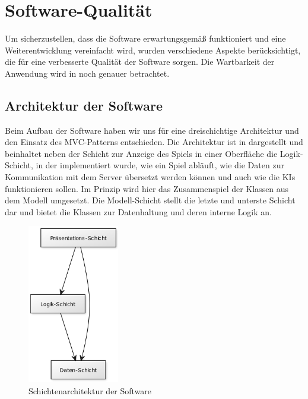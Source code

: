 \chapter{Software-Qualität}
\label{ch:software-qualitaet}

Um sicherzustellen, dass die Software erwartungsgemäß funktioniert und eine Weiterentwicklung vereinfacht wird, wurden
verschiedene Aspekte berücksichtigt, die für eine verbesserte Qualität der Software sorgen.
Die Wartbarkeit der Anwendung wird in  noch genauer betrachtet.

\section{Architektur der Software}
\label{sec:software-architektur}

Beim Aufbau der Software haben wir uns für eine dreischichtige Architektur und den Einsatz des \ac{MVC}-Patterns
 entschieden.
Die Architektur ist in  dargestellt und beinhaltet neben der Schicht zur Anzeige
des Spiels in einer Oberfläche die Logik-Schicht, in der \ua implementiert wurde, wie ein Spiel abläuft, wie
die Daten zur Kommunikation mit dem Server übersetzt werden können und auch wie die \ac{KI}s funktionieren sollen.
Im Prinzip wird hier das Zusammenspiel der Klassen aus dem Modell umgesetzt.
Die Modell-Schicht stellt die letzte und unterste Schicht dar und bietet die Klassen zur Datenhaltung und deren interne
Logik an. \\

\begin{figure}[htb]
\centering
\includegraphics[width=4cm]{Bilder/Diagramm_Schichtenmodell.png}
\caption{Schichtenarchitektur der Software}
\label{fig:schichtenarchitektur}
\end{figure}

